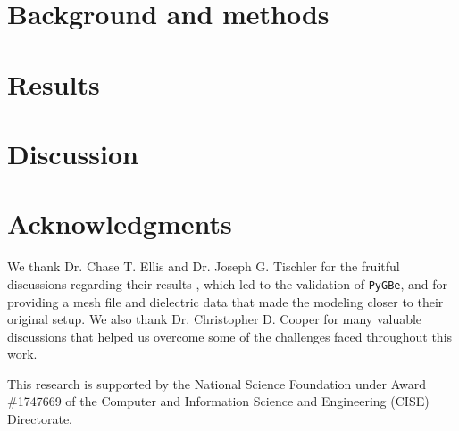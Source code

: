 \documentclass{rstransa} %
\newcommand{\pygbe}{\texttt{PyGBe}\xspace}
\begin{document}
\section{Background and methods}\label{sec:background}


\section{Results} \label{sec:results}



\section{Discussion}\label{sec:discussion}


\section*{Acknowledgments}

We thank Dr. Chase T. Ellis  and Dr. Joseph G. Tischler for the fruitful discussions regarding their results \cite{ellis2016}, 
which led to the validation of \pygbe, and for providing a mesh file and dielectric data that made the modeling closer to their original setup.
We also thank Dr. Christopher D. Cooper for many valuable discussions that helped us overcome some of the challenges faced throughout this work. 

This research is supported by the National Science Foundation under Award \#1747669 of the Computer and Information Science and Engineering (CISE) Directorate.


\end{document}
